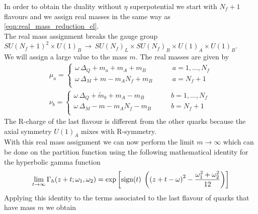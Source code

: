 In order to obtain the duality without $\eta$ superpotential we start with $N_f + 1 $ flavours and we assign real masses in the same way as \eqref{eqn:real_mass_reduction_el}. \\
The real mass assignment breaks the gauge group $ SU(N_f+1)^2 \times U(1)_B \, \rightarrow \, SU(N_f)_L \times SU(N_f)_R \times U(1)_A \times U(1)_B$. \\
We will assign a large value to the mass $m$. 
The real masses are given by
\begin{equation}
\begin{aligned}
\mu_a = 
  \begin{cases}
    \omega \, \Delta_Q + m_a + m_A + m_B \qquad  &a = 1, \dotsc, N_f\\ 
    \omega \, \Delta_M +  m - m_A N_f  + m_B \qquad  &a = N_f+1\\ 
  \end{cases}
  \\
\nu_b = 
  \begin{cases}
    \omega \, \Delta_Q + \tilde{m}_b + m_A - m_B \qquad  &b = 1, \dotsc, N_f\\ 
    \omega \, \Delta_M - m - m_A N_f  - m_B \qquad  &b = N_f+1\\ 
  \end{cases}
\end{aligned}
\end{equation}
The R-charge of the last flavour is different from the other quarks because the axial symmetry $U(1)_A$ mixes with R-symmetry.\\
With this real mass assignment we can now perform the limit $m \rightarrow \infty$ which can be done on the partition function using the following mathematical identity for the hyperbolic gamma function \cite{vanDeBult:2007}
\begin{equation}
 \lim_{ t \rightarrow \infty } \Gamma_h ( z + t; \omega_1, \omega_2) = 
\exp \left[ 
 \hbox{sign}(t) \; 
  \left(
    \left(
      z +t - \omega
    \right)^2 - \frac{\omega_1^2 + \omega_2^2}{12}
  \right)
\right]
\end{equation}
Applying this identity to the terms associated to the last flavour of quarks that have mass $m$ we obtain
